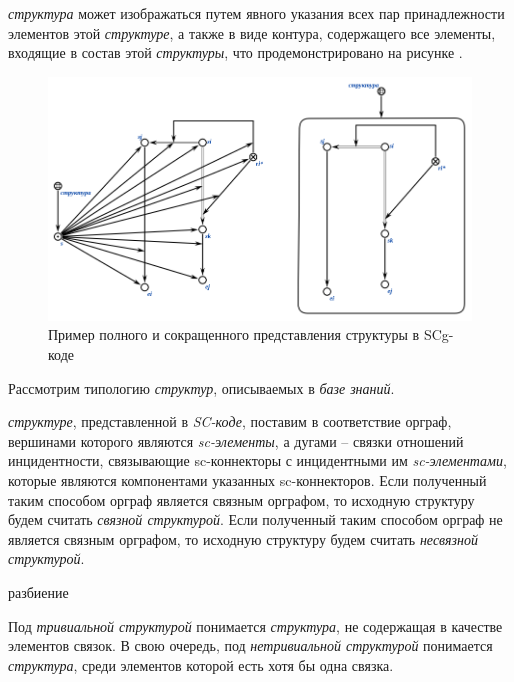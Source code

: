 \textit{структура} может изображаться путем явного указания всех пар принадлежности элементов этой \textit{структуре}, а также в виде контура, содержащего все элементы, входящие в состав этой \textit{структуры}, что продемонстрировано на рисунке \textit{}.

\begin{figure}[H]
	\includegraphics[scale=0.7]{author/part2/figures/chapter_kb/structure.png}
	\caption{Пример полного и сокращенного представления структуры в SCg-коде}
	\label{fig:structure_example}
\end{figure}


Рассмотрим типологию \textit{структур}, описываемых в \textit{базе знаний}.

\textit{структуре}, представленной в \textit{SC-коде}, поставим в соответствие орграф, вершинами которого являются \textit{sc-элементы}, а дугами – связки отношений инцидентности, связывающие sc-коннекторы с инцидентными им \textit{sc-элементами}, которые являются компонентами указанных sc-коннекторов. Если полученный таким способом орграф является связным орграфом, то исходную структуру будем считать \textit{связной структурой}. Если полученный таким способом орграф не является связным орграфом, то исходную структуру будем считать \textit{несвязной структурой}.

\begin{SCn}
	\begin{scnrelfromset}{разбиение}
	\end{scnrelfromset}
\end{SCn}

Под \textit{тривиальной структурой} понимается \textit{структура}, не содержащая в качестве элементов связок. В свою очередь, под \textit{нетривиальной структурой} понимается \textit{структура}, среди элементов которой есть хотя бы одна связка.

